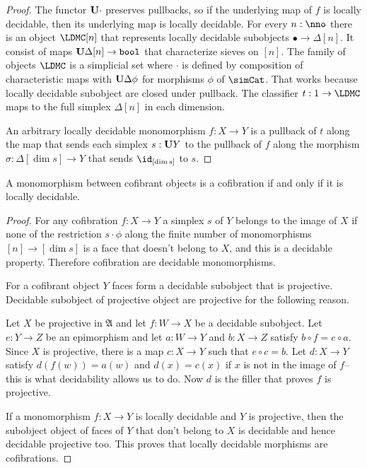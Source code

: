\documentclass{tac}
\newcommand\of{:}
\newcommand\simplex\Delta
\newcommand\bool{\mathtt{bool}}
\newcommand\ambient{\mathfrak A}
\begin{document}
\begin{proof} The functor $\mathbf{U}\cdot$ preserves pullbacks, so if the underlying map of $f$ is locally decidable, then its underlying map is locally decidable.
For every $n\of\nno$ there is an object $\LDMC[n]$ that represents locally decidable subobjects $\bullet\to\simplex[n]$. It consist of maps $\base\simplex[n]\to\bool$ that characterize sieves on $[n]$. The family of objects $\LDMC$ is a simplicial set where $\cdot$ is defined by composition of characteristic maps with $\base\simplex \phi$ for morphisms $\phi$ of $\simCat$. That works because locally decidable subobject are closed under pullback. The classifier $t\of 1\to\LDMC$ maps to the full simplex $\simplex[n]$ in each dimension.

An arbitrary locally decidable monomorphism $f\of X\to Y$ is a pullback of $t$ along the map that sends each simplex $s\of \base Y$ to the pullback of $f$ along the morphism $\sigma\of\simplex[\dim s]\to Y$ that sends $\id_{[\dim s]}$ to $s$.
\end{proof}

\begin{lemma} A monomorphism between cofibrant objects is a cofibration if and only if it is locally decidable. \label{cofibration iff locally decidable} \end{lemma}

\begin{proof} For any cofibration $f\of X\to Y$ a simplex $s$ of $Y$ belongs to the image of $X$ if none of the restriction $s\cdot \phi$ along the finite number of monomorphisms $[n]\to[\dim s]$ is a face that doesn't belong to $X$, and this is a decidable property. Therefore cofibration are decidable monomorphisms.

For a cofibrant object $Y$ faces form a decidable subobject that is projective. Decidable subobject of projective object are projective for the following reason. 

Let $X$ be projective in $\ambient$ and let $f\of W\to X$ be a decidable subobject. Let $e\of Y\to Z$ be an epimorphism and let $a\of W\to Y$ and $b\of X\to Z$ satisfy $b\circ f=e\circ a$. Since $X$ is projective, there is a map $c\of X\to Y$ such that $e\circ c= b$. Let $d\of X\to Y$ satisfy $d(f(w))=a(w)$ and $d(x)=c(x)$ if $x$ is not in the image of $f$--this is what decidability allows us to do. Now $d$ is the filler that proves $f$ is projective.

If a monomorphism $f\of X\to Y$ is locally decidable and $Y$ is projective, then the subobject object of faces of $Y$ that don't belong to $X$ is decidable and hence decidable projective too. This proves that locally decidable morphisms are cofibrations.
\end{proof}
\end{document}
